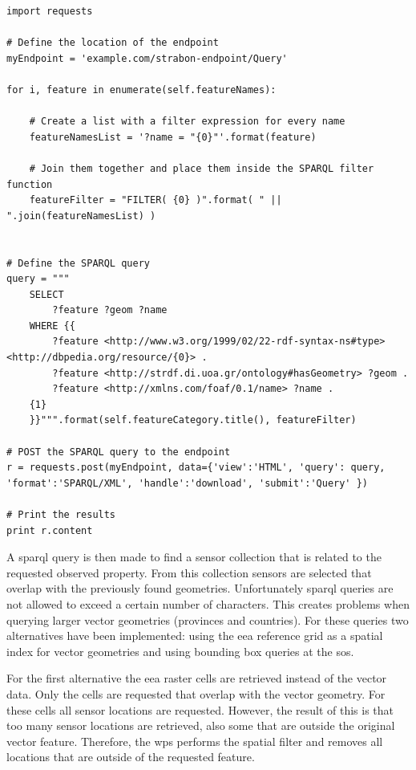 \begin{lstlisting}[float,caption={Example script that sends a SPARQL query for retreiving geometries of input features}, label={lst:getGeometries}]
import requests 

# Define the location of the endpoint
myEndpoint = 'example.com/strabon-endpoint/Query'

for i, feature in enumerate(self.featureNames):
	
	# Create a list with a filter expression for every name 
	featureNamesList = '?name = "{0}"'.format(feature)
	
	# Join them together and place them inside the SPARQL filter function
	featureFilter = "FILTER( {0} )".format( " || ".join(featureNamesList) )


# Define the SPARQL query
query = """
	SELECT 
		?feature ?geom ?name
	WHERE {{ 
		?feature <http://www.w3.org/1999/02/22-rdf-syntax-ns#type> <http://dbpedia.org/resource/{0}> . 
		?feature <http://strdf.di.uoa.gr/ontology#hasGeometry> ?geom . 
		?feature <http://xmlns.com/foaf/0.1/name> ?name . 
	{1}
	}}""".format(self.featureCategory.title(), featureFilter)

# POST the SPARQL query to the endpoint
r = requests.post(myEndpoint, data={'view':'HTML', 'query': query, 'format':'SPARQL/XML', 'handle':'download', 'submit':'Query' }) 

# Print the results
print r.content
\end{lstlisting}

A \ac{sparql} query is then made to find a sensor collection that is related to the requested observed property. From this collection sensors are selected that overlap with the previously found geometries. Unfortunately \ac{sparql} queries are not allowed to exceed a certain number of characters. This creates problems when querying larger vector geometries (provinces and countries). For these queries two alternatives have been implemented: using the \ac{eea} reference grid as a spatial index for vector geometries and using bounding box queries at the \ac{sos}. 

For the first alternative the \ac{eea} raster cells are retrieved instead of the vector data. Only the cells are requested that overlap with the vector geometry. For these cells all sensor locations are requested. However, the result of this is that too many sensor locations are retrieved, also some that are outside the original vector feature. Therefore, the \ac{wps} performs the spatial filter and removes all locations that are outside of the requested feature. 

